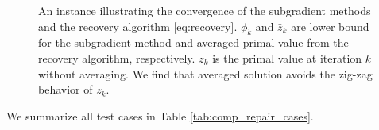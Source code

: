 \documentclass[../main]{subfiles}
\begin{document}
\begin{figure}

  \caption{
    An instance illustrating the convergence of the subgradient methods
    and the recovery algorithm \eqref{eq:recovery}.
    \(\phi_k\) and \(\bar z_k\) are lower bound for the subgradient method
    and averaged primal value from the recovery algorithm, respectively.
    \(z_k\) is the primal value at iteration \(k\) without averaging.
    We find that averaged solution avoids the zig-zag behavior of \(z_k\).
  }

  \label{fig:divergent_volume}
\end{figure}


We summarize all test cases in Table \ref{tab:comp_repair_cases}.
\end{document}
